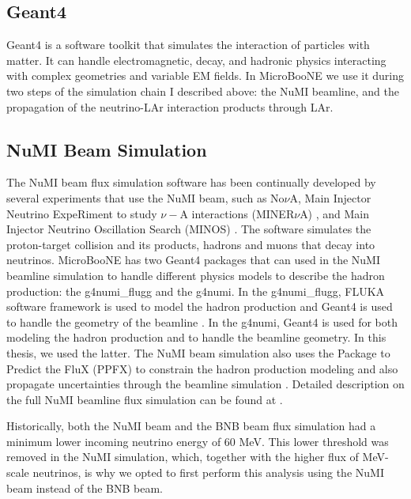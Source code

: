 \subsection{Geant4}

 Geant4 \cite{g4} is a software toolkit that simulates the interaction of particles with matter. It can handle electromagnetic, decay, and hadronic physics interacting with complex geometries and variable EM fields. In MicroBooNE we use it during two steps of the simulation chain I described above: the NuMI beamline, and the propagation of the neutrino-LAr interaction products through LAr.

\subsection{NuMI Beam Simulation}

The NuMI beam flux simulation software has been continually developed by several experiments that use the NuMI beam, such as No$\nu$A, Main Injector Neutrino ExpeRiment to study $\nu-$A interactions (MINER$\nu$A) \cite{minerva}, and Main Injector Neutrino Oscillation Search (MINOS) \cite{minos}. The software simulates the proton-target collision and its products, hadrons and muons that decay into neutrinos. MicroBooNE has two Geant4 packages that can used in the NuMI beamline simulation to handle different physics models to describe the hadron production: the g4numi\_flugg and the g4numi. In the g4numi\_flugg, FLUKA software framework is used to model the hadron production and Geant4 is used to handle the geometry of the beamline \cite{fluka}. In the g4numi, Geant4 is used for both modeling the hadron production and to handle the beamline geometry. In this thesis, we used the latter. 
The NuMI beam simulation also uses the Package to Predict the FluX (PPFX) to constrain the hadron production modeling and also propagate uncertainties through the beamline simulation \cite{ppfx}. Detailed description on the full NuMI beamline flux simulation can be found at \cite{krish_phd}. 

Historically, both the NuMI beam and the BNB beam flux simulation had a minimum lower incoming neutrino energy of $60$ MeV. This lower threshold was removed in the NuMI simulation, which, together with the higher flux of MeV-scale neutrinos, is why we opted to first perform this analysis using the NuMI beam instead of the BNB beam. 

